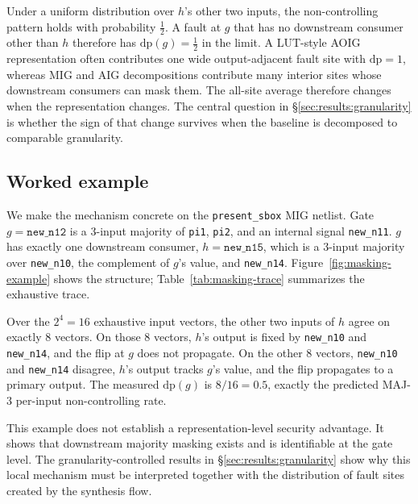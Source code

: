 Under a uniform distribution over $h$'s other two inputs, the
non-controlling pattern holds with probability $\frac{1}{2}$.
A fault at $g$ that has no downstream consumer other than $h$ therefore
has $\text{dp}(g) = \frac{1}{2}$ in the limit. A LUT-style AOIG
representation often contributes one wide output-adjacent fault site
with $\text{dp}=1$, whereas MIG and AIG decompositions contribute many
interior sites whose downstream consumers can mask them. The all-site
average therefore changes when the representation changes. The central
question in \S\ref{sec:results:granularity} is whether the sign of that
change survives when the baseline is decomposed to comparable
granularity.

\subsection{Worked example}
\label{sec:methodology:trace}

We make the mechanism concrete on the \texttt{present\_sbox} MIG
netlist. Gate $g = \texttt{new\_n12}$ is a 3-input majority of
\texttt{pi1}, \texttt{pi2}, and an internal signal \texttt{new\_n11}.
$g$ has exactly one downstream consumer, $h = \texttt{new\_n15}$,
which is a 3-input majority over \texttt{new\_n10}, the complement of
$g$'s value, and \texttt{new\_n14}.
Figure~\ref{fig:masking-example} shows the structure;
Table~\ref{tab:masking-trace} summarizes the exhaustive trace.




Over the $2^4 = 16$ exhaustive input vectors, the other two inputs
of $h$ agree on exactly 8 vectors. On those 8 vectors, $h$'s output is
fixed by \texttt{new\_n10} and \texttt{new\_n14}, and the flip at $g$
does not propagate. On the other 8 vectors, \texttt{new\_n10} and
\texttt{new\_n14} disagree, $h$'s output tracks $g$'s value, and the
flip propagates to a primary output. The measured $\text{dp}(g)$ is
$8/16 = 0.5$, exactly the predicted MAJ-3 per-input non-controlling
rate.

This example does not establish a representation-level security
advantage. It shows that downstream majority masking exists and is
identifiable at the gate level. The granularity-controlled
results in \S\ref{sec:results:granularity} show why this local mechanism
must be interpreted together with the distribution of fault sites created
by the synthesis flow.

